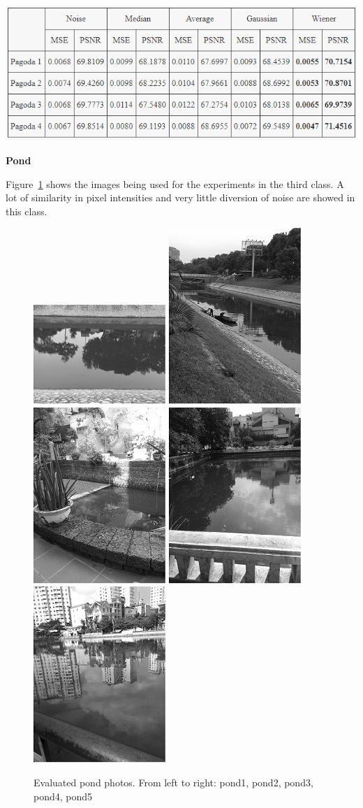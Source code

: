 \begin{center}
\includegraphics[width=15cm]{images/Pagoda.png}
\label{tab:pagoda}
\end{center}

\newpage

\textbf{Pond}

Figure~\ref{fig:pond} shows the images being used for the experiments in the third class. A lot of similarity in pixel intensities and very little diversion of noise are showed in this class.

\begin{figure}[h]
	\centering
	\includegraphics[width=0.18\columnwidth]{images/pond1.jpg}
	\includegraphics[width=0.18\columnwidth]{images/pond2.jpg}
	\includegraphics[width=0.18\columnwidth]{images/pond3.jpg}
	\includegraphics[width=0.18\columnwidth]{images/pond4.jpg}
	\includegraphics[width=0.18\columnwidth]{images/pond5.jpg}
	\caption{Evaluated pond photos. From left to right: pond1, pond2, pond3, pond4, pond5}
	\label{fig:pond}
\end{figure}


